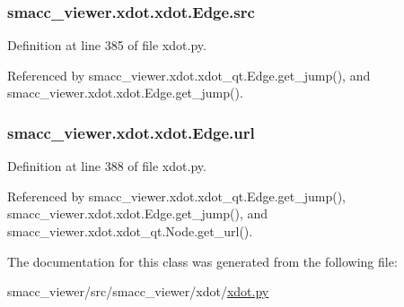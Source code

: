 \subsubsection[{\texorpdfstring{src}{src}}]{\setlength{\rightskip}{0pt plus 5cm}smacc\+\_\+viewer.\+xdot.\+xdot.\+Edge.\+src}\hypertarget{classsmacc__viewer_1_1xdot_1_1xdot_1_1Edge_ae8c708b03328bc06b00d2cc30626e61c}{}\label{classsmacc__viewer_1_1xdot_1_1xdot_1_1Edge_ae8c708b03328bc06b00d2cc30626e61c}


Definition at line 385 of file xdot.\+py.



Referenced by smacc\+\_\+viewer.\+xdot.\+xdot\+\_\+qt.\+Edge.\+get\+\_\+jump(), and smacc\+\_\+viewer.\+xdot.\+xdot.\+Edge.\+get\+\_\+jump().

\subsubsection[{\texorpdfstring{url}{url}}]{\setlength{\rightskip}{0pt plus 5cm}smacc\+\_\+viewer.\+xdot.\+xdot.\+Edge.\+url}\hypertarget{classsmacc__viewer_1_1xdot_1_1xdot_1_1Edge_aa940458bc40062bd2e9857bc02102171}{}\label{classsmacc__viewer_1_1xdot_1_1xdot_1_1Edge_aa940458bc40062bd2e9857bc02102171}


Definition at line 388 of file xdot.\+py.



Referenced by smacc\+\_\+viewer.\+xdot.\+xdot\+\_\+qt.\+Edge.\+get\+\_\+jump(), smacc\+\_\+viewer.\+xdot.\+xdot.\+Edge.\+get\+\_\+jump(), and smacc\+\_\+viewer.\+xdot.\+xdot\+\_\+qt.\+Node.\+get\+\_\+url().



The documentation for this class was generated from the following file\+:\begin{DoxyCompactItemize}
\item 
smacc\+\_\+viewer/src/smacc\+\_\+viewer/xdot/\hyperlink{xdot_8py}{xdot.\+py}\end{DoxyCompactItemize}
